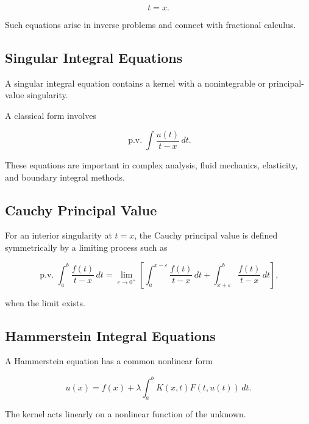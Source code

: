 \[
t=x.
\]

Such equations arise in inverse problems and connect with fractional
calculus.

\subsection{Singular Integral Equations}
\label{subsec:singular-integral-equations}

A singular integral equation contains a kernel with a nonintegrable or
principal-value singularity.

A classical form involves

\[
\boxed{
\operatorname{p.v.}
\int
\frac{
u(t)
}{
t-x
}
\,dt.
}
\]

These equations are important in complex analysis, fluid mechanics,
elasticity, and boundary integral methods.

\subsection{Cauchy Principal Value}
\label{subsec:cauchy-principal-value}

For an interior singularity at \(t=x\), the Cauchy principal value is
defined symmetrically by a limiting process such as

\[
\boxed{
\operatorname{p.v.}
\int_a^b
\frac{
f(t)
}{
t-x
}
\,dt
=
\lim_{\varepsilon\to0^+}
\left[
\int_a^{x-\varepsilon}
\frac{f(t)}{t-x}\,dt
+
\int_{x+\varepsilon}^{b}
\frac{f(t)}{t-x}\,dt
\right],
}
\]

when the limit exists.

\subsection{Hammerstein Integral Equations}
\label{subsec:hammerstein-integral-equations}

A Hammerstein equation has a common nonlinear form

\[
\boxed{
u(x)
=
f(x)
+
\lambda
\int_a^b
K(x,t)
F(t,u(t))
\,dt.
}
\]

The kernel acts linearly on a nonlinear function of the unknown.

